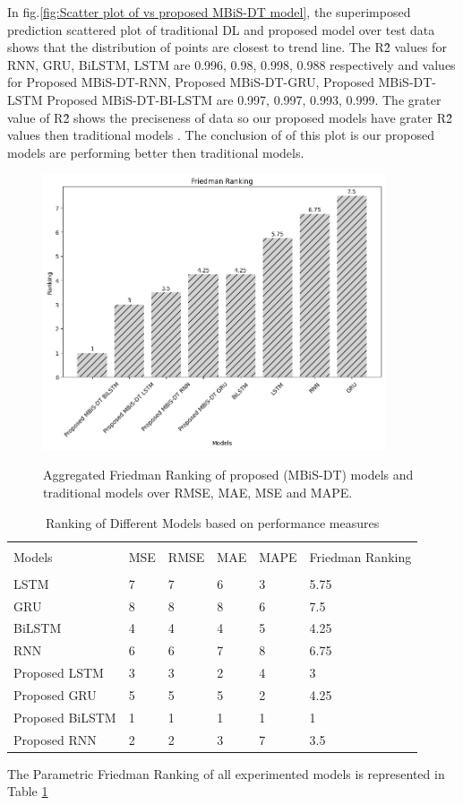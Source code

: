 \documentclass[sn-mathphys,Numbered]{sn-jnl}
\theoremstyle{thmstyleone}
\theoremstyle{thmstyletwo}
\theoremstyle{thmstylethree}
\begin{document}
In fig.\ref{fig:Scatter plot of vs proposed MBiS-DT model}, the superimposed prediction scattered plot of traditional DL and proposed model over test data shows that the distribution of points are closest to trend line.   The R\^2 values for RNN,  GRU,  BiLSTM,  LSTM are 0.996,  0.98,  0.998,  0.988 respectively and values for Proposed MBiS-DT-RNN,  Proposed MBiS-DT-GRU,  Proposed MBiS-DT-LSTM  Proposed MBiS-DT-BI-LSTM  are 0.997,  0.997,  0.993,  0.999.  The grater value of R\^2 shows the preciseness of data so our proposed models have grater R\^2 values then traditional models .  The conclusion of of this plot is our proposed models are performing better then traditional models.
\begin{figure}[ht!]
\centering
\includegraphics[width=0.9\textwidth, height=0.6\linewidth]{freidman_rank.png}
\label{fig:Friedman}
\caption{Aggregated Friedman Ranking of proposed (MBiS-DT) models and traditional models over RMSE, MAE, MSE and MAPE.}
\end{figure}

\begin{table}[ht!]
\begin{tabular}{l|lllll}
\hline
\\
Models& MSE & RMSE & MAE & MAPE & Friedman Ranking\\
\hline
\\
LSTM & 7 & 7 & 6 & 3 & 5.75 \\
GRU & 8 & 8 & 8 & 6 &7.5 \\
BiLSTM & 4 & 4 & 4 & 5 &4.25 \\
RNN & 6 & 6 & 7 & 8 &6.75 \\
Proposed LSTM & 3 & 3 & 2 & 4 & 3 \\
Proposed GRU & 5 & 5 & 5 & 2 &4.25 \\
Proposed BiLSTM & 1 & 1 & 1 & 1 &1 \\
Proposed RNN & 2 & 2 & 3 & 7 &3.5 \\ \hline
\end{tabular}
\caption{Ranking of Different Models based on performance measures}
\label{tab:Friedman}
\end{table}
The Parametric Friedman Ranking of all experimented models is represented in Table \ref{tab:Friedman}
\end{document}
